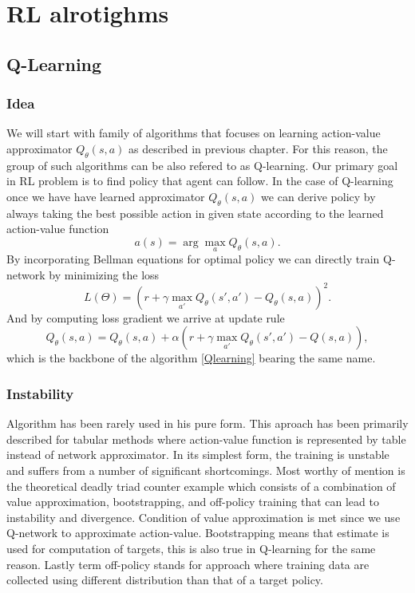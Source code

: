 \chapter{RL alrotighms}
\section{Q-Learning}

\subsection*{Idea}
We will start with family of algorithms that focuses on learning action-value approximator $Q_\theta(s,a)$ as described in previous chapter.
For this reason, the group of such algorithms can be also refered to as Q-learning.
Our primary goal in RL problem is to find policy that agent can follow.
In the case of Q-learning once we have have learned approximator $Q_\theta(s,a)$ we can derive policy by always taking the best possible action in given state according to the learned action-value function
\[a(s) = \arg \max_a Q_\theta(s,a).\]
By incorporating Bellman equations for optimal policy we can directly train Q-network by minimizing the loss
\[L(\Theta)=(r + \gamma \max_{a'} Q_\theta(s',a') - Q_\theta(s,a))^2.\]
And by computing loss gradient we arrive at update rule
\[Q_\theta(s,a) = Q_\theta(s,a) + \alpha (r + \gamma \max_{a'}Q_\theta(s',a') - Q(s,a)),\]
which is the backbone of the algorithm \ref*{Qlearning} bearing the same name.
\subsection*{Instability}
Algorithm has been rarely used in his pure form. 
This aproach has been primarily described for tabular methods where action-value function is represented by table instead of network approximator.
In its simplest form, the training is unstable and suffers from a number of significant shortcomings.
Most worthy of mention is the theoretical deadly triad counter example \cite{sutton2018reinforcement} which consists of a combination of value approximation, bootstrapping, and off-policy training that can lead to instability and divergence.
Condition of value approximation is met since we use Q-network to approximate action-value.
Bootstrapping means that estimate is used for computation of targets, this is also true in Q-learning for the same reason.
Lastly term off-policy stands for approach where training data are collected using different distribution than that of a target policy.





